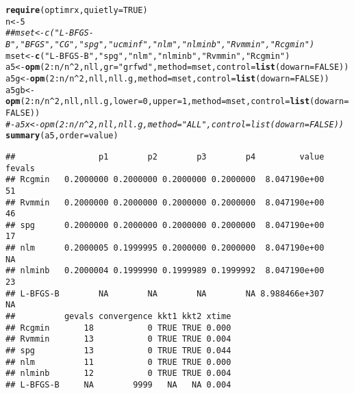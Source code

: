 \documentclass[11pt]{article}\usepackage[]{graphicx}\usepackage[]{color}
\makeatletter
\newcommand{\hlnum}[1]{\textcolor[rgb]{0.686,0.059,0.569}{#1}}%
\newcommand{\hlstr}[1]{\textcolor[rgb]{0.192,0.494,0.8}{#1}}%
\newcommand{\hlcom}[1]{\textcolor[rgb]{0.678,0.584,0.686}{\textit{#1}}}%
\newcommand{\hlopt}[1]{\textcolor[rgb]{0,0,0}{#1}}%
\newcommand{\hlstd}[1]{\textcolor[rgb]{0.345,0.345,0.345}{#1}}%
\newcommand{\hlkwb}[1]{\textcolor[rgb]{0.69,0.353,0.396}{#1}}%
\newcommand{\hlkwc}[1]{\textcolor[rgb]{0.333,0.667,0.333}{#1}}%
\newcommand{\hlkwd}[1]{\textcolor[rgb]{0.737,0.353,0.396}{\textbf{#1}}}%
\newenvironment{kframe}{%
 \def\at@end@of@kframe{}%
 \ifinner\ifhmode%
  \def\at@end@of@kframe{\end{minipage}}%
  \begin{minipage}{\columnwidth}%
 \fi\fi%
 \def\FrameCommand##1{\hskip\@totalleftmargin \hskip-\fboxsep
 \colorbox{shadecolor}{##1}\hskip-\fboxsep
     \hskip-\linewidth \hskip-\@totalleftmargin \hskip\columnwidth}%
 \MakeFramed {\advance\hsize-\width
   \@totalleftmargin\z@ \linewidth\hsize
   \@setminipage}}%
 {\par\unskip\endMakeFramed%
 \at@end@of@kframe}
\newenvironment{knitrout}{}{} %
\makeatother
\begin{document}
\begin{knitrout}\scriptsize
{}\color{fgcolor}\begin{kframe}
\begin{alltt}
\hlkwd{require}\hlstd{(optimrx,} \hlkwc{quietly}\hlstd{=}\hlnum{TRUE}\hlstd{)}
\hlstd{n}\hlkwb{<-}\hlnum{5}
\hlcom{## mset<-c("L-BFGS-B", "BFGS", "CG", "spg", "ucminf", "nlm", "nlminb", "Rvmmin", "Rcgmin")}
\hlstd{mset}\hlkwb{<-}\hlkwd{c}\hlstd{(}\hlstr{"L-BFGS-B"}\hlstd{,} \hlstr{"spg"}\hlstd{,} \hlstr{"nlm"}\hlstd{,} \hlstr{"nlminb"}\hlstd{,} \hlstr{"Rvmmin"}\hlstd{,} \hlstr{"Rcgmin"}\hlstd{)}
\hlstd{a5}\hlkwb{<-}\hlkwd{opm}\hlstd{(}\hlnum{2}\hlopt{:}\hlstd{n}\hlopt{/}\hlstd{n}\hlopt{^}\hlnum{2}\hlstd{, nll,} \hlkwc{gr}\hlstd{=}\hlstr{"grfwd"}\hlstd{,} \hlkwc{method}\hlstd{=mset,} \hlkwc{control}\hlstd{=}\hlkwd{list}\hlstd{(}\hlkwc{dowarn}\hlstd{=}\hlnum{FALSE}\hlstd{))}
\hlstd{a5g}\hlkwb{<-}\hlkwd{opm}\hlstd{(}\hlnum{2}\hlopt{:}\hlstd{n}\hlopt{/}\hlstd{n}\hlopt{^}\hlnum{2}\hlstd{, nll, nll.g,} \hlkwc{method}\hlstd{=mset,} \hlkwc{control}\hlstd{=}\hlkwd{list}\hlstd{(}\hlkwc{dowarn}\hlstd{=}\hlnum{FALSE}\hlstd{))}
\hlstd{a5gb}\hlkwb{<-}\hlkwd{opm}\hlstd{(}\hlnum{2}\hlopt{:}\hlstd{n}\hlopt{/}\hlstd{n}\hlopt{^}\hlnum{2}\hlstd{, nll, nll.g,} \hlkwc{lower}\hlstd{=}\hlnum{0}\hlstd{,} \hlkwc{upper}\hlstd{=}\hlnum{1}\hlstd{,} \hlkwc{method}\hlstd{=mset,} \hlkwc{control}\hlstd{=}\hlkwd{list}\hlstd{(}\hlkwc{dowarn}\hlstd{=}\hlnum{FALSE}\hlstd{))}
\hlcom{#- a5x <- opm(2:n/n^2, nll, nll.g, method="ALL", control=list(dowarn=FALSE))}
\hlkwd{summary}\hlstd{(a5,}\hlkwc{order}\hlstd{=value)}
\end{alltt}
\begin{verbatim}
##                 p1        p2        p3        p4         value fevals
## Rcgmin   0.2000000 0.2000000 0.2000000 0.2000000  8.047190e+00     51
## Rvmmin   0.2000000 0.2000000 0.2000000 0.2000000  8.047190e+00     46
## spg      0.2000000 0.2000000 0.2000000 0.2000000  8.047190e+00     17
## nlm      0.2000005 0.1999995 0.2000000 0.2000000  8.047190e+00     NA
## nlminb   0.2000004 0.1999990 0.1999989 0.1999992  8.047190e+00     23
## L-BFGS-B        NA        NA        NA        NA 8.988466e+307     NA
##          gevals convergence kkt1 kkt2 xtime
## Rcgmin       18           0 TRUE TRUE 0.000
## Rvmmin       13           0 TRUE TRUE 0.004
## spg          13           0 TRUE TRUE 0.044
## nlm          11           0 TRUE TRUE 0.000
## nlminb       12           0 TRUE TRUE 0.004
## L-BFGS-B     NA        9999   NA   NA 0.004
\end{verbatim}

\end{kframe}
\end{knitrout}
\end{document}

